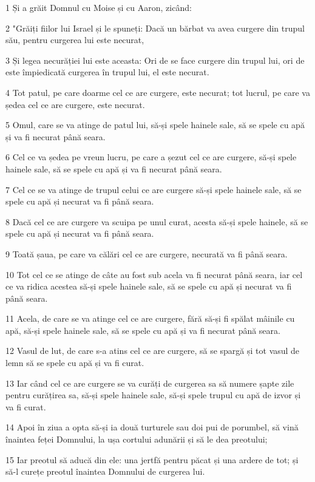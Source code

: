 \par 1 Și a grăit Domnul cu Moise și cu Aaron, zicând:
\par 2 "Grăiți fiilor lui Israel și le spuneți: Dacă un bărbat va avea curgere din trupul său, pentru curgerea lui este necurat,
\par 3 Și legea necurăției lui este aceasta: Ori de se face curgere din trupul lui, ori de este împiedicată curgerea în trupul lui, el este necurat.
\par 4 Tot patul, pe care doarme cel ce are curgere, este necurat; tot lucrul, pe care va ședea cel ce are curgere, este necurat.
\par 5 Omul, care se va atinge de patul lui, să-și spele hainele sale, să se spele cu apă și va fi necurat până seara.
\par 6 Cel ce va ședea pe vreun lucru, pe care a șezut cel ce are curgere, să-și spele hainele sale, să se spele cu apă și va fi necurat până seara.
\par 7 Cel ce se va atinge de trupul celui ce are curgere să-și spele hainele sale, să se spele cu apă și necurat va fi până seara.
\par 8 Dacă cel ce are curgere va scuipa pe unul curat, acesta să-și spele hainele, să se spele cu apă și necurat va fi până seara.
\par 9 Toată șaua, pe care va călări cel ce are curgere, necurată va fi până seara.
\par 10 Tot cel ce se atinge de câte au fost sub acela va fi necurat până seara, iar cel ce va ridica acestea să-și spele hainele sale, să se spele cu apă și necurat va fi până seara.
\par 11 Acela, de care se va atinge cel ce are curgere, fără să-și fi spălat mâinile cu apă, să-și spele hainele sale, să se spele cu apă și va fi necurat până seara.
\par 12 Vasul de lut, de care s-a atins cel ce are curgere, să se spargă și tot vasul de lemn să se spele cu apă și va fi curat.
\par 13 Iar când cel ce are curgere se va curăți de curgerea sa să numere șapte zile pentru curățirea sa, să-și spele hainele sale, să-și spele trupul cu apă de izvor și va fi curat.
\par 14 Apoi în ziua a opta să-și ia două turturele sau doi pui de porumbel, să vină înaintea feței Domnului, la ușa cortului adunării și să le dea preotului;
\par 15 Iar preotul să aducă din ele: una jertfă pentru păcat și una ardere de tot; și să-l curețe preotul înaintea Domnului de curgerea lui.
